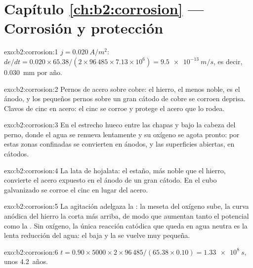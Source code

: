 \section*{Capítulo \ref{ch:b2:corrosion} --- Corrosión y protección}

\begin{solution}{exo:b2:corrosion:1}
$j = \qty{0.020}{A/m^2}$: $de/dt = 0.020 \times 65.38/(2 \times 96\,485 \times 7.13
\times 10^6) = \qty{9.5e-13}{m/s}$, es decir, \qty{0.030}{mm} por año.
\end{solution}

\begin{solution}{exo:b2:corrosion:2}
Pernos de acero sobre cobre: el hierro, el menos noble, es el ánodo, y los pequeños pernos
sobre un gran cátodo de cobre se corroen deprisa. Clavos de cinc en acero: el cinc se corroe
y protege el acero que lo rodea.
\end{solution}

\begin{solution}{exo:b2:corrosion:3}
En el estrecho hueco entre las chapas y bajo la cabeza del perno, donde el agua
se renueva lentamente y su oxígeno se agota pronto: por 
estas zonas confinadas se convierten en ánodos, y las superficies abiertas, en cátodos.
\end{solution}

\begin{solution}{exo:b2:corrosion:4}
La lata de hojalata: el estaño, más noble que el hierro, convierte el acero expuesto en el ánodo de un
gran cátodo. En el cubo galvanizado se corroe el cinc en lugar del
acero.
\end{solution}

\begin{solution}{exo:b2:corrosion:5}
La agitación adelgaza la : la meseta del oxígeno sube, la curva anódica
del hierro la corta más arriba, de modo que aumentan tanto el potencial como la . Sin oxígeno, la única reacción catódica que queda en agua neutra
es la lenta reducción del agua: el  baja y la
 se vuelve muy pequeña.
\end{solution}

\begin{solution}{exo:b2:corrosion:6}
$t = 0.90 \times 5000 \times 2 \times 96\,485/(65.38 \times 0.10) = \qty{1.33e8}{s}$,
unos 4.2~años.
\end{solution}

